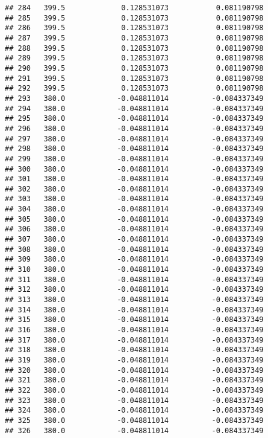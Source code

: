 \documentclass[]{article}
\begin{document}
\begin{verbatim}
## 284   399.5             0.128531073           0.081190798
## 285   399.5             0.128531073           0.081190798
## 286   399.5             0.128531073           0.081190798
## 287   399.5             0.128531073           0.081190798
## 288   399.5             0.128531073           0.081190798
## 289   399.5             0.128531073           0.081190798
## 290   399.5             0.128531073           0.081190798
## 291   399.5             0.128531073           0.081190798
## 292   399.5             0.128531073           0.081190798
## 293   380.0            -0.048811014          -0.084337349
## 294   380.0            -0.048811014          -0.084337349
## 295   380.0            -0.048811014          -0.084337349
## 296   380.0            -0.048811014          -0.084337349
## 297   380.0            -0.048811014          -0.084337349
## 298   380.0            -0.048811014          -0.084337349
## 299   380.0            -0.048811014          -0.084337349
## 300   380.0            -0.048811014          -0.084337349
## 301   380.0            -0.048811014          -0.084337349
## 302   380.0            -0.048811014          -0.084337349
## 303   380.0            -0.048811014          -0.084337349
## 304   380.0            -0.048811014          -0.084337349
## 305   380.0            -0.048811014          -0.084337349
## 306   380.0            -0.048811014          -0.084337349
## 307   380.0            -0.048811014          -0.084337349
## 308   380.0            -0.048811014          -0.084337349
## 309   380.0            -0.048811014          -0.084337349
## 310   380.0            -0.048811014          -0.084337349
## 311   380.0            -0.048811014          -0.084337349
## 312   380.0            -0.048811014          -0.084337349
## 313   380.0            -0.048811014          -0.084337349
## 314   380.0            -0.048811014          -0.084337349
## 315   380.0            -0.048811014          -0.084337349
## 316   380.0            -0.048811014          -0.084337349
## 317   380.0            -0.048811014          -0.084337349
## 318   380.0            -0.048811014          -0.084337349
## 319   380.0            -0.048811014          -0.084337349
## 320   380.0            -0.048811014          -0.084337349
## 321   380.0            -0.048811014          -0.084337349
## 322   380.0            -0.048811014          -0.084337349
## 323   380.0            -0.048811014          -0.084337349
## 324   380.0            -0.048811014          -0.084337349
## 325   380.0            -0.048811014          -0.084337349
## 326   380.0            -0.048811014          -0.084337349

\end{verbatim}
\end{document}
